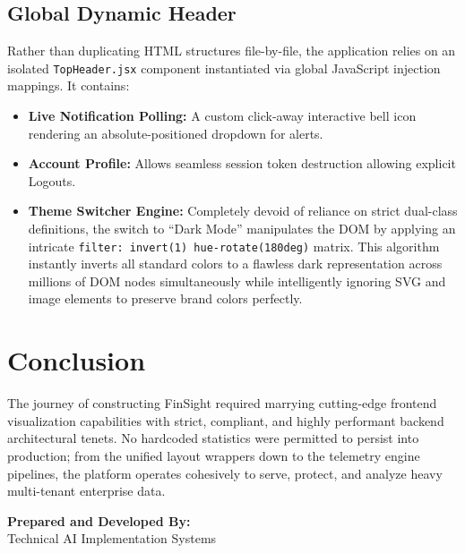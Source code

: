 \documentclass[12pt,a4paper]{report}
\begin{document}
\section{Global Dynamic Header}
Rather than duplicating HTML structures file-by-file, the application relies on an isolated \texttt{TopHeader.jsx} component instantiated via global JavaScript injection mappings.
It contains:
\begin{itemize}
    \item \textbf{Live Notification Polling:} A custom click-away interactive bell icon rendering an absolute-positioned dropdown for alerts.
    \item \textbf{Account Profile:} Allows seamless session token destruction allowing explicit Logouts.
    \item \textbf{Theme Switcher Engine:} Completely devoid of reliance on strict dual-class definitions, the switch to ``Dark Mode'' manipulates the DOM by applying an intricate \texttt{filter: invert(1) hue-rotate(180deg)} matrix. This algorithm instantly inverts all standard colors to a flawless dark representation across millions of DOM nodes simultaneously while intelligently ignoring SVG and image elements to preserve brand colors perfectly.
\end{itemize}

\chapter{Conclusion}
The journey of constructing FinSight required marrying cutting-edge frontend visualization capabilities with strict, compliant, and highly performant backend architectural tenets. No hardcoded statistics were permitted to persist into production; from the unified layout wrappers down to the telemetry engine pipelines, the platform operates cohesively to serve, protect, and analyze heavy multi-tenant enterprise data. 

\vspace{1cm}
\noindent \textbf{Prepared and Developed By:} \\
\noindent Technical AI Implementation Systems
\end{document}
